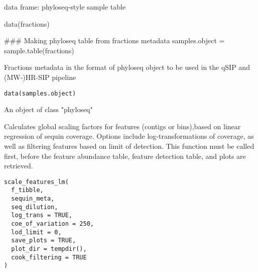 \documentclass[a4paper]{book}
\begin{document}
%
\begin{Value}
data  frame: phyloseq-style sample table
\end{Value}
%
\begin{Examples}
\begin{ExampleCode}
data(fractions)



### Making phyloseq table from fractions metadata
samples.object = sample.table(fractions)

\end{ExampleCode}
\end{Examples}
%
\begin{Description}\relax
Fractions metadata in the format of phyloseq object to be used in the qSIP and (MW-)HR-SIP pipeline
\end{Description}
%
\begin{Usage}
\begin{verbatim}
data(samples.object)
\end{verbatim}
\end{Usage}
%
\begin{Format}
An object of class "phyloseq"
\end{Format}
%
\begin{Description}\relax
Calculates global scaling factors for features (contigs or bins),based on linear regression of sequin coverage. Options include log-transformations of coverage, as well as filtering features based on limit of detection. This function must be called first, before the feature abundance table, feature detection table, and plots are retrieved.
\end{Description}
%
\begin{Usage}
\begin{verbatim}
scale_features_lm(
  f_tibble,
  sequin_meta,
  seq_dilution,
  log_trans = TRUE,
  coe_of_variation = 250,
  lod_limit = 0,
  save_plots = TRUE,
  plot_dir = tempdir(),
  cook_filtering = TRUE
)
\end{verbatim}
\end{Usage}
%
\end{document}
